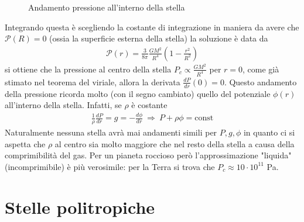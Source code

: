 \documentclass[a4paper, oneside]{book}
\begin{document}
\begin{figure}
    \centering
    \caption{Andamento pressione all'interno della stella}
\end{figure} \noindent
Integrando questa è scegliendo la costante di integrazione in maniera da avere che $\mathcal{P}(R) = 0$ (ossia la superficie esterna della stella)
la soluzione è data da
\begin{gather*}
    \mathcal{P}(r) = \frac{3}{8\pi} \frac{GM^{2}}{R^4}\left(1 - \frac{r^{2}}{R^{2}}\right)
\end{gather*}
si ottiene che la pressione al centro della stella $P_c \propto \frac{GM^{2}}{R^{4}}$ per $r = 0$, come già stimato nel teorema del viriale, allora 
la derivata $\frac{dP}{dr}(0) = 0$. Questo andamento della pressione ricorda molto (con il segno 
cambiato) quello del potenziale $\phi(r)$ all'interno della stella. Infatti, se $\rho$ è costante 
\begin{gather*}
    \frac{1}{\rho} \frac{dP}{dr} = g = - \frac{d\phi}{dr} \ \Longrightarrow \ P + \rho \phi = \text{const}
\end{gather*}
Naturalmente nessuna stella avrà mai andamenti simili per $P, g, \phi$ in quanto ci si aspetta che 
$\rho$ al centro sia molto maggiore che nel resto della stella a causa della comprimibilità
del gas. Per un pianeta roccioso però l'approssimazione "liquida" (incomprimibile) è più verosimile: 
per la Terra si trova che $P_c \approx 10 \cdot 10^{11} $ Pa. 

\section{Stelle politropiche}
\end{document}
